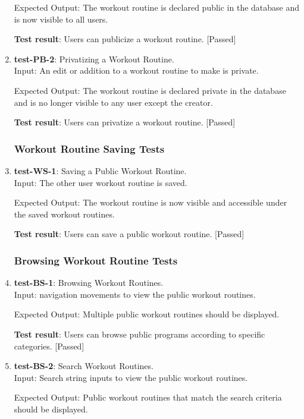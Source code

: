 \documentclass[12pt, titlepage]{article}
\begin{document}
\begin{enumerate}
    Expected Output: The workout routine is declared public in the database and is now visible to all users.
    
    \textbf{Test result}: Users can publicize a workout routine. [Passed]
   
    \item{\textbf{test-PB-2}}: Privatizing a Workout Routine.\\
    Input: An edit or addition to a workout routine to make is private.
	
    Expected Output: The workout routine is declared private in the database and is no longer visible to any user except the creator.
    
    \textbf{Test result}: Users can privatize a workout routine. [Passed]
   
\subsubsection{Workout Routine Saving Tests}
    \item{\textbf{test-WS-1}}: Saving a Public Workout Routine.\\
    Input: The other user workout routine is saved.
	
    Expected Output: The workout routine is now visible and accessible under the saved workout routines.
    
    \textbf{Test result}: Users can save a public workout routine. [Passed]
   
\subsubsection{Browsing Workout Routine Tests}
    \item{\textbf{test-BS-1}}: Browsing Workout Routines.\\
    Input: navigation movements to view the public workout routines.
	
    Expected Output: Multiple public workout routines should be displayed.
     
    \textbf{Test result}: Users can browse public programs according to specific categories. [Passed]
   
    \item{\textbf{test-BS-2}}: Search Workout Routines.\\
    Input: Search string inputs to view the public workout routines.
	
    Expected Output: Public workout routines that match the search criteria should be displayed. 
    

\end{enumerate}
\end{document}

